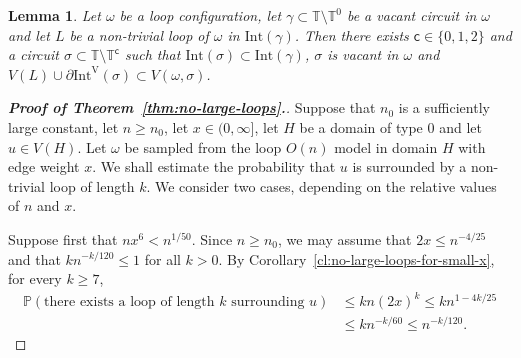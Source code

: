 \documentclass[12pt,reqno]{article}
\def\T{\mathbb{T}}
\newtheorem{lemma}[theorem]{Lemma}
\renewcommand{\Pr}{\mathbb{P}}
\newcommand{\Int}[1]{\mathrm{Int}(#1)}
\newcommand{\IntVert}[1]{\mathrm{Int}^\mathrm{V}(#1)}
\newcommand{\clr}{{{\mathsf{c}}}}
\begin{document}
\begin{lemma}\label{lem:existence-of-good-outer-circuit}
Let $\omega$ be a loop configuration, let $\gamma \subset \T\setminus\T^0$ be a vacant circuit in $\omega$ and let $L$ be a non-trivial loop of $\omega$ in $\Int\gamma$. Then there exists $\clr\in\{0,1,2\}$ and a circuit $\sigma \subset \T\setminus\T^{\clr}$ such that $\Int\sigma \subset \Int\gamma$, $\sigma$ is vacant in $\omega$ and $V(L) \cup \partial \IntVert\sigma \subset V(\omega,\sigma)$.
\end{lemma}


\begin{proof}[{\bf Proof of Theorem~\ref{thm:no-large-loops}.}]
\label{sec:11}
Suppose that $n_0$ is a sufficiently large constant, let $n \ge n_0$, let $x \in (0,\infty]$, let $H$ be a domain of type 0 and let $u \in V(H)$. Let $\omega$ be sampled from the loop $O(n)$ model in domain $H$ with edge weight $x$. We shall estimate the probability that $u$ is surrounded by a non-trivial loop of length $k$. We consider two cases, depending on the relative values of $n$ and $x$.

Suppose first that $nx^6 < n^{1/50}$. Since $n \ge n_0$, we may
assume that $2x \le n^{-4/25}$ and that $kn^{-k/120} \le 1$ for all
$k>0$. By Corollary~\ref{cl:no-large-loops-for-small-x}, for every
$k \ge 7$,
\[
\begin{split}
  \Pr(\text{there exists a loop of length $k$ surrounding $u$}) & \le k n (2x)^k \le k n^{1-4k/25} \\
  & \le k n^{-k/60} \le n^{-k/120}.
\end{split}
\]


\end{proof}
\end{document}
